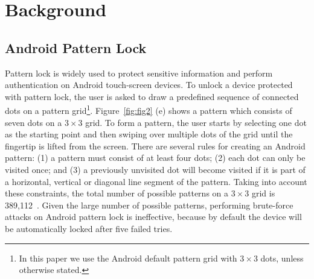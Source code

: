%
%
%
%
%
%
%
%
%
%
\section{Background}
    \subsection{Android Pattern Lock}
        Pattern lock is widely used to protect sensitive information and perform authentication on
        Android touch-screen devices. To unlock a device protected with pattern lock, the user is asked to draw a predefined sequence of connected dots on a pattern grid\footnote{In this paper we use the Android default pattern grid with $3 \times 3$ dots, unless otherwise stated.}.
        Figure~\ref{fig:fig2} (e) shows a pattern which consists of seven dots on a $3 \times 3$ grid.
        To form a
        pattern, the user starts by selecting one dot as the
        starting point and then swiping over multiple dots of the grid until the fingertip is lifted from the screen.
        There are several rules for creating an Android pattern: (1) a pattern must consist
        of at least four dots; (2) each dot can only be visited once; and (3) a previously unvisited dot will
        become visited if it is part of a horizontal, vertical or diagonal
        line segment of the pattern. Taking into account these constraints, the total number of possible patterns
        on a $3\times3$ grid is 389,112~\cite{uellenbeck2013quantifying}.
        Given the large number of possible patterns, performing brute-force attacks on
        Android pattern lock is ineffective, because by default the device will be
        automatically locked after five failed tries.

